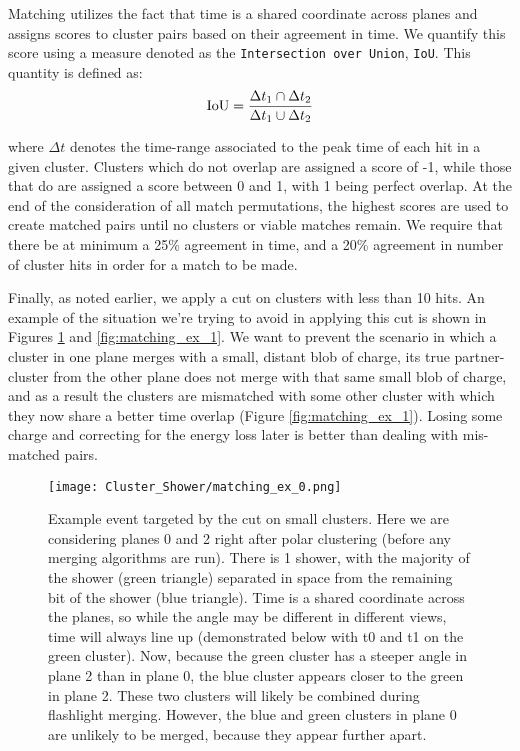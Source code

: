 \par Matching utilizes the fact that time is a shared coordinate across planes and assigns scores to cluster pairs based on their agreement in time. We quantify this score using a measure denoted as the \texttt{Intersection over Union}, \texttt{IoU}. This quantity is defined as:
\begin{equation}
  {\rm IoU} = \frac{ \Delta t_1 \cap \Delta t_2  }{ \Delta t_1 \cup \Delta t_2 }
\end{equation}

\noindent where $\Delta t$ denotes the time-range associated to the peak time of each hit in a given cluster.  Clusters which do not overlap are assigned a score of -1, while those that do are assigned a score between 0 and 1, with 1 being perfect overlap. At the end of the consideration of all match permutations, the highest scores are used to create matched pairs until no clusters or viable matches remain. We require that there be at minimum a 25\% agreement in time, and a 20\% agreement in number of cluster hits in order for a match to be made. 
\par Finally, as noted earlier, we apply a cut on clusters with less than 10 hits. An example of the situation we're trying to avoid in applying this cut is shown in Figures \ref{fig:matching_ex_0} and \ref{fig:matching_ex_1}.  We want to prevent the scenario in which a cluster in one plane merges with a small, distant blob of charge, its true partner-cluster from the other plane does not merge with that same small blob of charge, and as a result the clusters are mismatched with some other cluster with which they now share a better time overlap (Figure \ref{fig:matching_ex_1}). Losing some charge and correcting for the energy loss later is better than dealing with mis-matched pairs.

\begin{figure}[H]
\centering
\texttt{[image: Cluster\_Shower/matching\_ex\_0.png]}
\caption{Example event targeted by the cut on small clusters. Here we are considering planes 0 and 2 right after polar clustering (before any merging algorithms are run).  There is 1 shower, with the majority of the shower (green triangle) separated in space from the remaining bit of the shower (blue triangle).  Time is a shared coordinate across the planes, so while the angle may be different in different views, time will always line up (demonstrated below with t0 and t1 on the green cluster).  Now, because the green cluster has a steeper angle in plane 2 than in plane 0, the blue cluster appears closer to the green in plane 2.  These two clusters will likely be combined during flashlight merging.  However, the blue and green clusters in plane 0 are unlikely to be merged,  because they appear further apart. }
\label{fig:matching_ex_0}
\end{figure}

